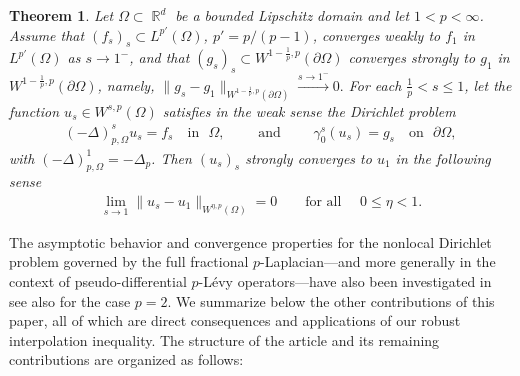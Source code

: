 \documentclass[12pt, reqno]{amsart}%
\theoremstyle{plain}  %
\newtheorem{theorem}{Theorem}[section]
\theoremstyle{definition}  %
\theoremstyle{remark}
\numberwithin{equation}{section}
\DeclareMathOperator{\R}{\mathbb{R}}
\begin{document}
\begin{theorem}
\label{thm:converg-dirichlet-frac-regional}
Let $\Omega \subset \R^d$ be a bounded Lipschitz domain and let $1<p<\infty$. Assume that $(f_s)_s \subset L^{p'}(\Omega)$, $p'=p/(p-1)$, converges weakly to $f_1$ in $L^{p'}(\Omega)$ as $s\to 1^-$, and that $(g_s)_s \subset W^{1-\frac{1}{p},p}(\partial\Omega)$ converges strongly to $g_1$ in $W^{1-\frac{1}{p},p}(\partial\Omega)$, namely, $\|g_s-g_1\|_{W^{1-\frac{1}{p},p}(\partial\Omega)}
\xrightarrow{s\to1^-}0.$  For each $\frac{1}{p} < s \le 1$, let  the function
$u_s \in W^{s,p}(\Omega)$ satisfies in the weak sense the Dirichlet problem
\begin{align*}
(-\Delta)^s_{p,\Omega} u_s= f_s \quad \text{in }\,\,  \Omega, \qquad \text{  and }\qquad \gamma^s_0 (u_s )= g_s \quad \text{on } \,\, \partial \Omega,
\end{align*}
\noindent with $(-\Delta)^1_{p,\Omega}=-\Delta_{p} $. Then $(u_s)_s$ strongly converges to $u_1$  in the following sense
\begin{align*}
\lim_{s\to1}\|u_s -u_1\|_{W^{\eta,p}(\Omega)} =0 \qquad\text{for all }\quad 0\leq \eta<1.
\end{align*}
\end{theorem}
The asymptotic behavior and convergence properties for the nonlocal Dirichlet problem governed by the full fractional $p$-Laplacian—and more generally in the context of pseudo-differential $p$-L\'evy operators—have also been investigated in \cite{Fog25, Fog26} see also \cite{FoKa24,BudT26,guy-thesis,Voi17} for the case $p=2$.
\noindent We summarize below the other contributions of this paper, all of which are direct consequences and applications of our robust interpolation inequality. The structure of the article and its remaining contributions are organized as follows:
\end{document}
